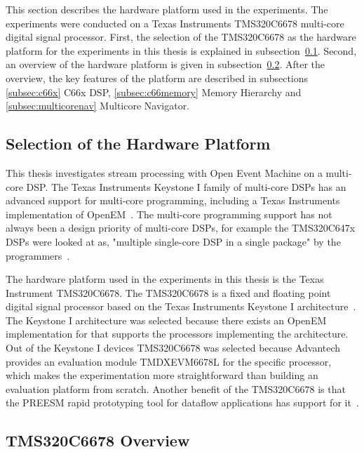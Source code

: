 This section describes the hardware platform used in the experiments. The experiments were conducted on a Texas Instruments TMS320C6678 multi-core digital signal processor. First, the selection of the TMS320C6678 as the hardware platform for the experiments in this thesis is explained in subsection~\ref{subsec:selection-of-platform}. Second, an overview of the hardware platform is given in subsection~\ref{subsec:hw-overview}. After the overview, the key features of the platform are described in subsections \ref{subsec:c66x} C66x DSP, \ref{subsec:c66memory} Memory Hierarchy and \ref{subsec:multicorenav} Multicore Navigator.

\subsection{Selection of the Hardware Platform}
\label{subsec:selection-of-platform}
This thesis investigates stream processing with Open Event Machine on a multi-core DSP. The Texas Instruments Keystone I family of multi-core DSPs has an advanced support for multi-core programming, including a Texas Instruments implementation of OpenEM~\cite{MCSDKbrochure}. The multi-core programming support has not always been a design priority of multi-core DSPs, for example the TMS320C647x DSPs were looked at as, "multiple single-core DSP in a single package" by the programmers~\cite{openemwhite}.

The hardware platform used in the experiments in this thesis is the Texas Instrument TMS320C6678. The TMS320C6678 is a fixed and floating point digital signal processor based on the Texas Instruments Keystone I architecture~\cite{tmsdatasheet}. The Keystone I architecture was selected because there exists an OpenEM implementation for that supports the processors implementing the architecture. Out of the Keystone I devices TMS320C6678 was selected because Advantech provides an evaluation module TMDXEVM6678L for the specific processor, which makes the experimentation more straightforward than building an evaluation platform from scratch. Another benefit of the TMS320C6678 is that the PREESM rapid prototyping tool for dataflow applications has support for it~\cite{pelcat2014preesm}.

\subsection{TMS320C6678 Overview}
\label{subsec:hw-overview}

